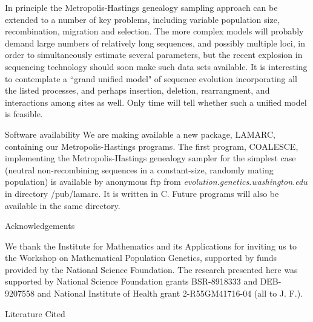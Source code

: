 In principle the Metropolis-Hastings genealogy sampling approach can be
extended to a number of key problems, including variable population
size, recombination, migration and selection.  The more complex models
will probably demand large numbers of relatively long sequences, and
possibly multiple loci, in order
to simultaneously estimate several parameters, but the recent explosion
in sequencing technology should soon make such data sets available.
It is interesting to contemplate a ``grand unified model" of sequence
evolution incorporating all the listed processes, and perhaps insertion,
deletion, rearrangment, and interactions among sites as well.  Only time
will tell whether such a unified model is feasible.

\bigskip
{\center Software availability}
We are making available a new package, LAMARC, containing our
Metropolis-Hastings programs.  The first program, COALESCE,
implementing the Metropolis-Hastings genealogy sampler for
the simplest case (neutral non-recombining sequences in a constant-size,
randomly mating population) is available by anonymous ftp from {\it
evolution.genetics.washington.edu} in directory /pub/lamarc.  It is
written in C.  Future programs will also be available in the same
directory.

\bigskip
{\center Acknowledgements}

\bigskip

We thank the Institute for Mathematics and its Applications for inviting
us to the Workshop on Mathematical Population Genetics, supported by
funds provided by the National Science Foundation.  The research
presented here was supported by National
Science Foundation grants BSR-8918333 and DEB-9207558 and National Institute of
Health grant 2-R55GM41716-04 (all to J. F.).

\bigskip
{\center Literature Cited}

\bigskip


